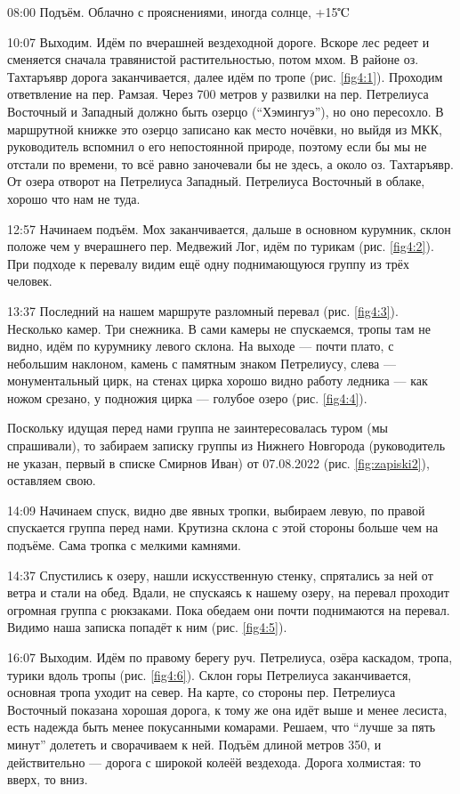 08:00 Подъём.
Облачно с прояснениями, иногда солнце, +15$\tccentigrade$

10:07 Выходим.
Идём по вчерашней вездеходной дороге. Вскоре лес редеет и сменяется сначала травянистой растительностью, потом мхом.
В районе оз. Тахтаръявр дорога заканчивается, далее идём по тропе (рис. \ref{fig4:1}).
Проходим ответвление на пер. Рамзая. Через 700 метров у развилки на пер. Петрелиуса Восточный и Западный
должно быть озерцо (``Хэмингуэ''), но оно пересохло. В маршрутной книжке это озерцо записано как место ночёвки,
но выйдя из МКК, руководитель вспомнил о его непостоянной природе, поэтому если бы мы не отстали по времени,
то всё равно заночевали бы не здесь, а около оз. Тахтаръявр.
От озера отворот на Петрелиуса Западный. Петрелиуса Восточный в облаке, хорошо что нам не туда.

12:57 Начинаем подъём. Мох заканчивается, дальше в основном курумник, склон положе чем у вчерашнего пер. Медвежий Лог,
идём по турикам (рис. \ref{fig4:2}). При подходе к перевалу видим ещё одну поднимающуюся группу из трёх человек.

13:37 Последний на нашем маршруте разломный перевал (рис. \ref{fig4:3}). Несколько камер. Три снежника.
В сами камеры не спускаемся,
тропы там не видно, идём по курумнику левого склона. На выходе --- почти плато, с небольшим наклоном,
камень с памятным знаком Петрелиусу, слева --- монументальный цирк, на стенах цирка хорошо видно
работу ледника --- как ножом срезано, у подножия цирка --- голубое озеро (рис. \ref{fig4:4}).

Поскольку идущая перед нами группа не заинтересовалась туром (мы спрашивали), то забираем записку группы из
Нижнего Новгорода (руководитель не указан, первый в списке Смирнов Иван) от 07.08.2022 (рис. \ref{fig:zapiski2}), оставляем свою.

14:09 Начинаем спуск, видно две явных тропки, выбираем левую, по правой спускается группа перед нами.
Крутизна склона с этой стороны больше чем на подъёме. Сама тропка с мелкими камнями.

14:37 Спустились к озеру, нашли искусственную стенку, спрятались за ней от ветра и стали на обед.
Вдали, не спускаясь к нашему озеру, на перевал проходит огромная группа с рюкзаками.
Пока обедаем они почти поднимаются на перевал. Видимо наша записка попадёт к ним (рис. \ref{fig4:5}).

16:07 Выходим.
Идём по правому берегу руч. Петрелиуса, озёра каскадом, тропа, турики вдоль тропы (рис. \ref{fig4:6}).
Склон горы Петрелиуса заканчивается, основная тропа уходит на север. На карте, со стороны пер. Петрелиуса Восточный
показана хорошая дорога, к тому же она идёт выше и менее лесиста, есть надежда быть менее покусанными комарами.
Решаем, что \enquote{лучше за пять минут} долететь и сворачиваем к ней.
Подъём длиной метров 350, и действительно --- дорога с широкой колеёй вездехода. Дорога холмистая: то вверх, то вниз.

